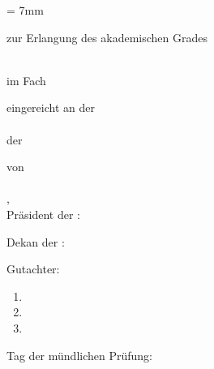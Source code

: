 \makeatletter
\begin{titlepage}
\hoffset = 7mm
\addtolength{\textheight}{5cm}
\begin{spacing}{1}
  \setlength{\parindentbak}{\parindent}
  \setlength{\parskipbak}{\parskip}
\setlength{\parindent}{0pt}
\setlength{\parskip}{\baselineskip}
\thispagestyle{empty}
\Large
\begin{center}
{\huge\sc\@disstitle}


zur Erlangung des akademischen Grades

\@degree\\
im Fach\\
\@degreesubj
\end{center}
\vspace{2\parskip}
eingereicht an der\\
\@faculty\\
der \@university

von\\
{\mdseries\@authorprefix\,\@authorfirst\,\@authorlast}\\
{\normalsize \@authorbornin, \@authorbornthe}\\

\vfill
\large%
Pr\"asident der \@university:\\[+1mm]
{\large\@president}

Dekan der \@faculty:\\[+1mm]
{\large\@dean}

Gutachter:
\begin{enumerate}[%
leftmargin=*,%
widest=3,%
align=left,%
]
\item{\large \@gutachtera}
\item{\large \@gutachterb}
\item{\large \@gutachterc}
\end{enumerate}
\nopagebreak[4]
Tag der m\"undlichen Pr\"ufung: {\large\@dateexam}
\setlength{\parindent}{\parindentbak}
\setlength{\parskip}{\parskipbak}
\end{spacing}
\end{titlepage}
\makeatother
\newpage
\thispagestyle{empty}
\cleardoublepage